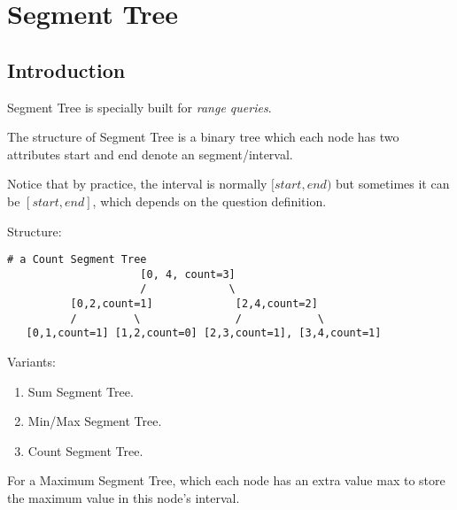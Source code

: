 \section{Segment Tree}\label{section:segmentTree}
\subsection{Introduction}
Segment Tree is specially built for \textit{range queries}. 

The structure of Segment Tree is a binary tree which each node has two attributes start and end denote an segment/interval. 

Notice that by practice, the interval is normally $[start, end)$ but sometimes it can be $[start, end]$, which depends on the question definition. 

Structure:  
\begin{lstlisting}[columns=flexible]
# a Count Segment Tree
                     [0, 4, count=3]
                     /             \
          [0,2,count=1]             [2,4,count=2]
          /         \               /            \
   [0,1,count=1] [1,2,count=0] [2,3,count=1], [3,4,count=1]
\end{lstlisting}
Variants:
\begin{enumerate}
\item Sum Segment Tree.
\item Min/Max Segment Tree.
\item Count Segment Tree. 
\end{enumerate}

For a Maximum Segment Tree, which each node has an extra value max to store the maximum value in this node's interval.

